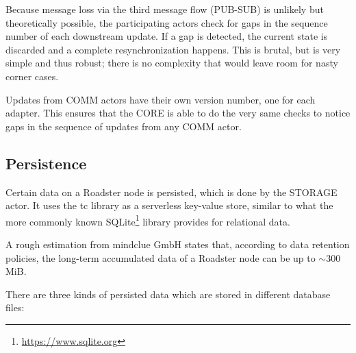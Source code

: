 Because message loss via the third message flow (PUB-SUB) is unlikely but
theoretically possible, the participating actors check for gaps in the sequence number of
each downstream update. If a gap is detected, the current state is discarded and a
complete resynchronization happens. This is brutal, but is very simple and thus
robust; there is no complexity that would leave room for nasty corner cases.

Updates from COMM actors have their own version number, one for each adapter.
This ensures that the CORE is able to do the very same checks to notice
gaps in the sequence of updates from any COMM actor.



\subsection{Persistence}\label{sec:scope:persistence}
Certain data on a Roadster node is persisted, which is done by the STORAGE
actor. It uses the
\gls{tc} library as a
serverless key-value store, similar to what the more commonly known
SQLite\footnote{\url{https://www.sqlite.org}} library provides for relational data.

A rough estimation from mindclue GmbH states that, according to data retention
policies, the long-term accumulated data of a Roadster node can be up to $\sim$300 MiB.

There are three kinds of persisted data which are stored in different database files:

